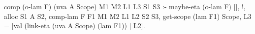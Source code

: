   comp (o-lam F) (uva A Scope) M1 M2 L1 L3 S1 S3 :-
    maybe-eta (o-lam F) [], !,
      alloc S1 A S2,
      comp-lam F F1 M1 M2 L1 L2 S2 S3,
      get-scope (lam F1) Scope, 
      L3 = [val (link-eta (uva A Scope) (lam F1)) | L2].
